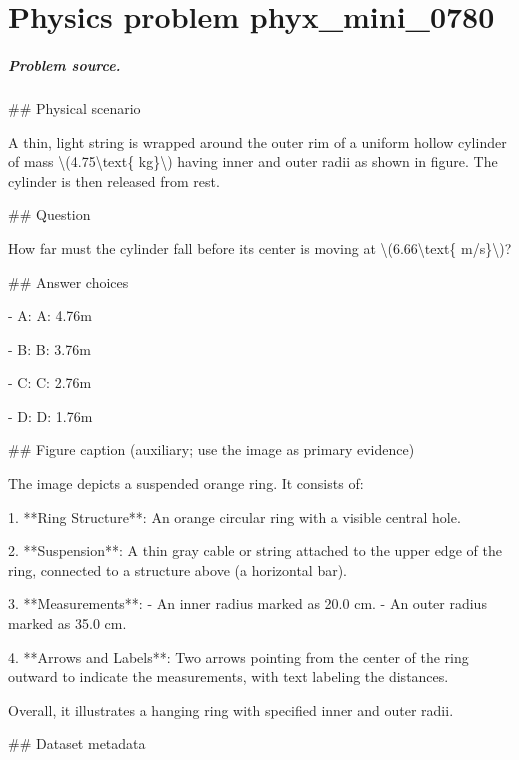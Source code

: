 
\chapter{Physics problem phyx\_mini\_0780}
\label{ch:PhyXMiniProblems_problem_phyx_mini_0780}

\paragraph{Problem source.}
\#\# Physical scenario

A thin, light string is wrapped around the outer rim of a uniform hollow cylinder of mass \textbackslash{}(4.75\textbackslash{}text\{ kg\}\textbackslash{}) having inner and outer radii as shown in figure. The cylinder is then released from rest.

\#\# Question

How far must the cylinder fall before its center is moving at \textbackslash{}(6.66\textbackslash{}text\{ m/s\}\textbackslash{})?

\#\# Answer choices

- A: A: 4.76m

- B: B: 3.76m

- C: C: 2.76m

- D: D: 1.76m

\#\# Figure caption (auxiliary; use the image as primary evidence)

The image depicts a suspended orange ring. It consists of:

1. **Ring Structure**: An orange circular ring with a visible central hole.
   
2. **Suspension**: A thin gray cable or string attached to the upper edge of the ring, connected to a structure above (a horizontal bar).

3. **Measurements**:
   - An inner radius marked as 20.0 cm.
   - An outer radius marked as 35.0 cm.
   
4. **Arrows and Labels**: Two arrows pointing from the center of the ring outward to indicate the measurements, with text labeling the distances.

Overall, it illustrates a hanging ring with specified inner and outer radii.

\#\# Dataset metadata


